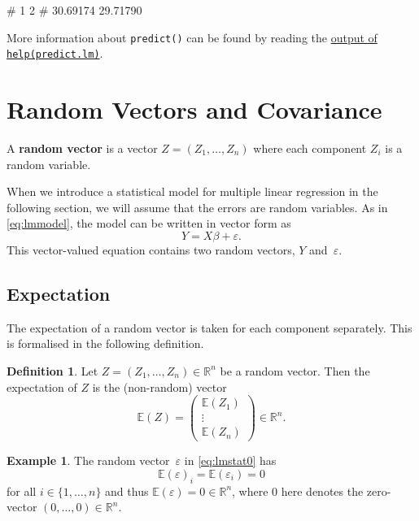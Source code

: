 \documentclass[
  a4paper,
]{article}
\newenvironment{Shaded}{\begin{snugshade}}{\end{snugshade}}
\newcommand{\NormalTok}[1]{#1}
\theoremstyle{definition}
\newtheorem{definition}{Definition}[section]
\theoremstyle{definition}
\newtheorem{example}{Example}[section]
\theoremstyle{definition}
\theoremstyle{definition}
\theoremstyle{remark}
\begin{document}
\begin{Shaded}
\begin{Highlighting}[]
\NormalTok{\#        1        2 }
\NormalTok{\# 30.69174 29.71790}
\end{Highlighting}
\end{Shaded}

More information about \texttt{predict()} can be found by reading
the \href{https://rdrr.io/r/stats/predict.lm.html}{output of \texttt{help(predict.lm)}}.

\clearpage

\section{Random Vectors and Covariance}\label{S03-cov}

A \textbf{random vector} is a vector \(Z = (Z_1, \ldots, Z_n)\)
where each component \(Z_i\) is a random variable.

When we introduce a statistical model for multiple linear regression in
the following section, we will assume that the errors are random variables.
As in \eqref{eq:lmmodel}, the model can be written in vector form as
\begin{equation}
  Y = X \beta + \varepsilon.  \label{eq:lmstat0}
\end{equation}
This vector-valued equation contains two random vectors, \(Y\) and~\(\varepsilon\).

\subsection{Expectation}\label{expectation}

The expectation of a random vector is taken for each component separately.
This is formalised in the following definition.

\begin{definition}
Let \(Z = (Z_1, \ldots, Z_n) \in \mathbb{R}^n\) be a random vector.
Then the expectation of \(Z\) is the (non-random) vector
\begin{equation*}
    \mathbb{E}(Z)
    = \begin{pmatrix}
      \mathbb{E}(Z_1) \\ \vdots \\ \mathbb{E}(Z_n)
    \end{pmatrix}
    \in \mathbb{R}^n.
  \end{equation*}
\end{definition}

\begin{example}
The random vector~\(\varepsilon\) in \eqref{eq:lmstat0} has
\begin{equation*}
    \mathbb{E}(\varepsilon)_i = \mathbb{E}(\varepsilon_i) = 0
  \end{equation*}
for all \(i \in \{1, \ldots, n\}\) and thus \(\mathbb{E}(\varepsilon) = 0 \in \mathbb{R}^n\),
where \(0\) here denotes the zero-vector \((0, \ldots, 0) \in \mathbb{R}^n\).
\end{example}
\end{document}
